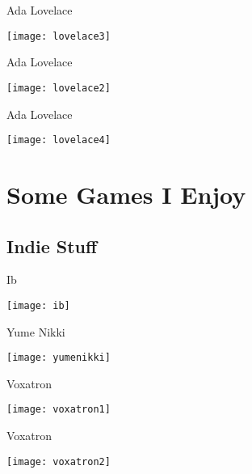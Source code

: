 \begin{frame}{Ada Lovelace}\begin{center}
\texttt{[image: lovelace3]}\end{center}
\end{frame}

\begin{frame}{Ada Lovelace}\begin{center}
\texttt{[image: lovelace2]}\end{center}
\end{frame}

\begin{frame}{Ada Lovelace}\begin{center}
\texttt{[image: lovelace4]}\end{center}
\end{frame}

\section{Some Games I Enjoy}
\subsection{Indie Stuff}

\begin{frame}{Ib}\begin{center}
\texttt{[image: ib]}\end{center}
\end{frame}

\begin{frame}{Yume Nikki}\begin{center}
\texttt{[image: yumenikki]}\end{center}
\end{frame}


\begin{frame}{Voxatron}\begin{center}
\texttt{[image: voxatron1]}\end{center}
\end{frame}


\begin{frame}{Voxatron}\begin{center}
\texttt{[image: voxatron2]}\end{center}
\end{frame} 